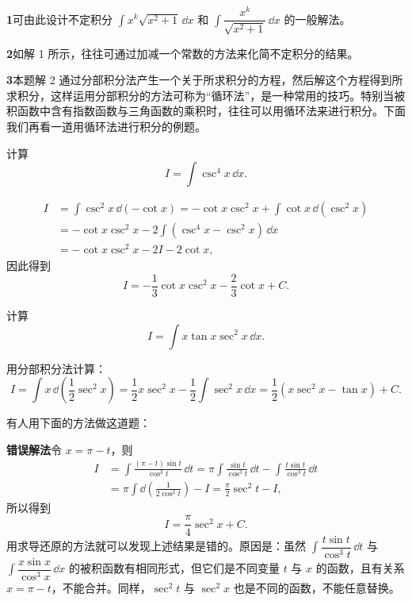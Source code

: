 \begin{xremark}
\textbf{1}\quad 可由此设计不定积分 $\int x^k\sqrt{x^2+1}\,\dd x$ 和 $\int\dfrac{x^k}{\sqrt{x^2+1}}\,\dd x$ 的一般解法。
\end{xremark}

\begin{xremark}
\textbf{2}\quad 如解 1 所示，往往可通过加减一个常数的方法来化简不定积分的结果。
\end{xremark}

\begin{xremark}
\textbf{3}\quad 本题解 2 通过分部积分法产生一个关于所求积分的方程，然后解这个方程得到所求积分，这样运用分部积分的方法可称为“循环法”，是一种常用的技巧。特别当被积函数中含有指数函数与三角函数的乘积时，往往可以用循环法来进行积分。下面我们再看一道用循环法进行积分的例题。
\end{xremark}

\begin{xexample}[9.1.3]
计算
\[
  I=\int\csc^4x\,\dd x.
\]
\end{xexample}

\begin{xsolution}
\begin{align*}
  I
  &=\int\csc^2x\,\dd(-\cot x)
   =-\cot x\csc^2x+\int\cot x\,\dd(\csc^2x)\\
  &=-\cot x\csc^2x-2\int(\csc^4x-\csc^2x)\,\dd x\\
  &=-\cot x\csc^2x-2I-2\cot x,
\end{align*}
因此得到
\[
  I=-\frac13\cot x\csc^2x-\frac23\cot x+C.
\]
\end{xsolution}

\begin{xexample}[9.1.4]
计算
\[
  I=\int x\tan x\sec^2x\,\dd x.
\]
\end{xexample}

\begin{xsolution}
用分部积分法计算：
\[
  I=\int x\,\dd\left(\frac12\sec^2x\right)
   =\frac12x\sec^2x-\frac12\int\sec^2x\,\dd x
   =\frac12(x\sec^2x-\tan x)+C.
\]
\end{xsolution}

\begin{xremark}
有人用下面的方法做这道题：

\textbf{错误解法}\quad 令 $x=\pi-t$，则
\begin{align*}
  I
  &=\int\frac{(\pi-t)\sin t}{\cos^3t}\,\dd t
   =\pi\int\frac{\sin t}{\cos^3t}\,\dd t
    -\int\frac{t\sin t}{\cos^3t}\,\dd t\\
  &=\pi\int\dd\left(\frac1{2\cos^2t}\right)-I
   =\frac\pi2\sec^2t-I,
\end{align*}
所以得到
\[
  I=\frac\pi4\sec^2x+C.
\]
用求导还原的方法就可以发现上述结果是错的。原因是：虽然 $\int\dfrac{t\sin t}{\cos^3t}\,\dd t$ 与 $\int\dfrac{x\sin x}{\cos^3x}\,\dd x$ 的被积函数有相同形式，但它们是不同变量 $t$ 与 $x$ 的函数，且有关系 $x=\pi-t$，不能合并。同样，$\sec^2t$ 与 $\sec^2x$ 也是不同的函数，不能任意替换。
\end{xremark}


